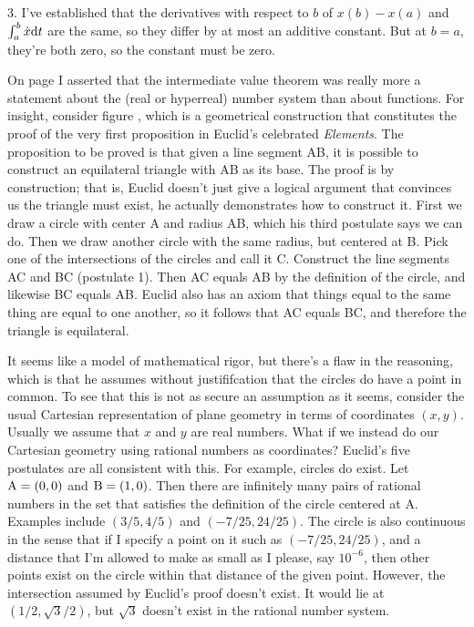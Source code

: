 3. I've established that the derivatives with respect to $b$ of $x(b)-x(a)$ and $\int_a^b \dot{x} \textup{d} t$ are the same, so they differ by
at most an additive constant. But at $b=a$, they're both zero, so the constant must be zero.

\pagebreak


On page \pageref{intermediate-value-ref-to-detour} I asserted that the intermediate value theorem was
really more a statement about the (real or hyperreal) number system than about functions. For insight,
consider figure , which is a geometrical construction that constitutes the proof of the
very first proposition in Euclid's celebrated \emph{Elements}. The proposition to be proved is that given
a line segment AB, it is possible to construct an equilateral triangle with AB as its base. The proof is
by construction; that is, Euclid doesn't just give a logical argument that convinces us the triangle must
exist, he actually demonstrates how to construct it. First we draw a circle with center
A and radius AB, which his third postulate says we can do. Then we draw another circle with the same radius,
but centered at B. Pick one of the intersections of the circles and call it C. Construct the line segments
AC and BC (postulate 1). Then AC equals AB by the definition of the
circle, and likewise BC equals AB. Euclid also has an axiom that things equal
to the same thing are equal to one another, so it follows that AC equals BC, and therefore the triangle is equilateral.


It seems like a model of mathematical rigor, but there's a flaw in the reasoning, which is that he assumes
without justififcation that the circles do have a point in common. To see that this is not as secure an assumption as it seems, consider
the usual Cartesian representation of plane geometry in terms of coordinates $(x,y)$.
Usually we assume that $x$ and $y$ are real numbers. What if we instead do our Cartesian geometry
using rational numbers as coordinates? Euclid's five postulates are all consistent with this.
For example, circles do exist. Let $\textup{A}=(0,0)$ and $\textup{B}=(1,0)$. Then there are infinitely
many pairs of rational numbers in the set that satisfies the definition of the circle centered at A. Examples include $(3/5,4/5)$
and $(-7/25,24/25)$. The circle is also continuous in the sense that if I specify a point on it such
as $(-7/25,24/25)$, and a distance that I'm allowed to make as small as I please, say $10^{-6}$, then other
points exist on the circle within that distance of the given point. However, the intersection
assumed by Euclid's proof doesn't exist. It would lie at $(1/2,\sqrt{3}/2)$, but $\sqrt{3}$ doesn't
exist in the rational number system.


